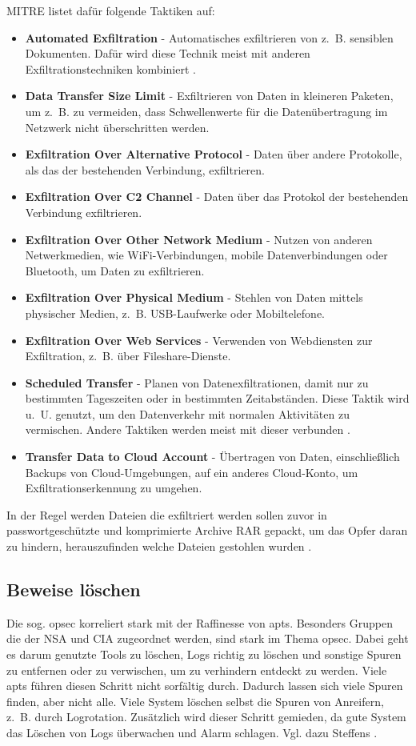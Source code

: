 \documentclass[conference]{IEEEtran}
\begin{document}
MITRE \cite{MITREExfiltration} listet dafür folgende Taktiken auf:
\begin{itemize}
    \item \textbf{Automated Exfiltration} - Automatisches exfiltrieren von z.~B. sensiblen Dokumenten. Dafür wird diese Technik meist mit anderen Exfiltrationstechniken kombiniert \cite{MITREAutomatedExfiltration}.
    \item \textbf{Data Transfer Size Limit} - Exfiltrieren von Daten in kleineren Paketen, um z.~B. zu vermeiden, dass Schwellenwerte für die Datenübertragung im Netzwerk nicht überschritten werden.
    \item \textbf{Exfiltration Over Alternative Protocol} - Daten über andere Protokolle, als das der bestehenden Verbindung, exfiltrieren.
    \item \textbf{Exfiltration Over C2 Channel} - Daten über das Protokol der bestehenden Verbindung exfiltrieren.
    \item \textbf{Exfiltration Over Other Network Medium} - Nutzen von anderen Netwerkmedien, wie WiFi-Verbindungen, mobile Datenverbindungen oder Bluetooth, um Daten zu exfiltrieren.
    \item \textbf{Exfiltration Over Physical Medium} - Stehlen von Daten mittels physischer Medien, z.~B. USB-Laufwerke oder Mobiltelefone.
    \item \textbf{Exfiltration Over Web Services} - Verwenden von Webdiensten zur Exfiltration, z.~B. über Fileshare-Dienste.
    \item \textbf{Scheduled Transfer} - Planen von Datenexfiltrationen, damit nur zu bestimmten Tageszeiten oder in bestimmten Zeitabständen. Diese Taktik wird u.~U. genutzt, um den Datenverkehr mit normalen Aktivitäten zu vermischen. Andere Taktiken werden meist mit dieser verbunden \cite{MITREScheduledTransfer}.
    \item \textbf{Transfer Data to Cloud Account} - Übertragen von Daten, einschließlich Backups von Cloud-Umgebungen, auf ein anderes Cloud-Konto, um Exfiltrationserkennung zu umgehen.
\end{itemize}

In der Regel werden Dateien die exfiltriert werden sollen zuvor in passwortgeschützte und komprimierte Archive RAR gepackt, um das Opfer daran zu hindern, herauszufinden welche Dateien gestohlen wurden \cite[S.~19]{Steffens2020}.

\subsection{Beweise löschen}
Die sog. \ac{opsec} korreliert stark mit der Raffinesse von \acp{apt}.
Besonders Gruppen die der NSA und CIA zugeordnet werden, sind stark im Thema \ac{opsec}.
Dabei geht es darum genutzte Tools zu löschen, Logs richtig zu löschen und sonstige Spuren zu entfernen oder zu verwischen, um zu verhindern entdeckt zu werden.
Viele \acp{apt} führen diesen Schritt nicht sorfältig durch.
Dadurch lassen sich viele Spuren finden, aber nicht alle.
Viele System löschen selbst die Spuren von Anreifern, z.~B. durch Logrotation.
Zusätzlich wird dieser Schritt gemieden, da gute System das Löschen von Logs überwachen und Alarm schlagen.
Vgl. dazu Steffens \cite[S.~19f]{Steffens2020}.
\end{document}
